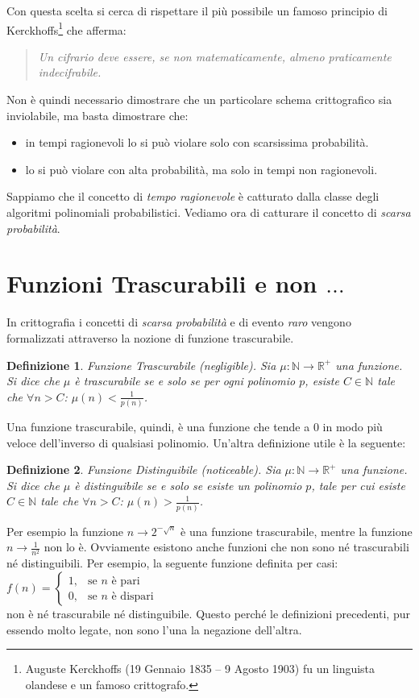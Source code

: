 \documentclass[a4paper,openright,twoside,12pt]{report}
\newtheorem{definizione}{Definizione}[chapter]
\begin{document}
Con questa scelta si cerca di rispettare il pi\`u possibile un famoso principio di Kerckhoffs\footnote{Auguste Kerckhoffs (19 Gennaio 1835 – 9 Agosto 1903) 
fu un linguista olandese e un famoso crittografo.} che afferma: 
\begin{quotation}
\em
Un cifrario deve essere, se non matematicamente, almeno praticamente indecifrabile.
\end{quotation}
Non \`e quindi necessario dimostrare che un particolare schema crittografico sia inviolabile, ma basta dimostrare che:
\begin{itemize}
 \item in tempi ragionevoli lo si pu\`o violare solo con scarsissima probabilit\`a.
 \item lo si pu\`o violare con alta probabilit\`a, ma solo in tempi non ragionevoli.
\end{itemize}
Sappiamo che il concetto di \emph{tempo ragionevole} \`e catturato dalla classe degli algoritmi polinomiali probabilistici. Vediamo ora di catturare il concetto di \emph{scarsa probabilit\`a}.
\section{Funzioni Trascurabili e non $\dots$}
In crittografia i concetti di \emph{scarsa probabilit\`a} e di evento \emph{raro} vengono formalizzati attraverso la nozione di funzione trascurabile.
\begin{definizione}{Funzione Trascurabile (negligible).}
Sia $\mu: \mathbb{N} \rightarrow \mathbb{R^{+}}$ una funzione. Si dice che $\mu$ \`e trascurabile se e solo se per ogni polinomio $p$, esiste $C \in \mathbb{N} $ tale che $\forall n>C$: $\mu(n) < \frac{1}{p(n)}$.  
\end{definizione}
Una funzione trascurabile, quindi, \`e una funzione che tende a 0 in modo pi\`u veloce dell'inverso di qualsiasi polinomio.
Un'altra definizione utile \`e la seguente:
\begin{definizione}{Funzione Distinguibile (noticeable).}
Sia $\mu: \mathbb{N} \rightarrow \mathbb{R^{+}}$ una funzione. Si dice che $\mu$ \`e distinguibile se e solo se esiste un polinomio $p$, tale per cui esiste $C \in \mathbb{N} $ tale che $\forall n>C$: $\mu(n) > \frac{1}{p(n)}$.  
\end{definizione}
Per esempio la funzione $n \rightarrow 2^{-\sqrt{n}}$ \`e una funzione trascurabile, mentre la funzione $n \rightarrow \frac{1}{n^2}$ non lo \`e. 
Ovviamente esistono anche funzioni che non sono n\'e trascurabili n\'e distinguibili. Per esempio, la seguente funzione definita per casi:
$f(n) = \begin{cases} 1, & \mbox{se } n\mbox{ \`e pari} \\ 0, & \mbox{se } n\mbox{ \`e dispari} \end{cases}$\\
non \`e n\'e trascurabile n\'e distinguibile. Questo perch\'e le definizioni precedenti, pur essendo molto legate, non sono l'una la negazione dell'altra.
\end{document}
